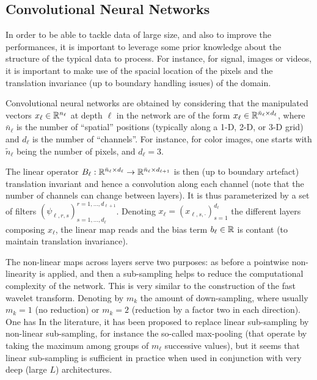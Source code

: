 \subsection{Convolutional Neural Networks}
\label{sec-cnn}

In order to be able to tackle data of large size, and also to improve the performances, it is important to leverage some prior knowledge about the structure of the typical data to process. For instance, for signal, images or videos, it is important to make use of the spacial location of the pixels and the translation invariance (up to boundary handling issues) of the domain.

Convolutional neural networks are obtained by considering that the manipulated vectors $x_\ell \in \mathbb{R}^{n_\ell}$ at depth $\ell$ in the network are of the form $x_\ell \in \mathbb{R}^{ \bar n_\ell \times d_\ell }$, where $\bar n_\ell$ is the number of ``spatial'' positions (typically along a 1-D, 2-D, or 3-D grid) and $d_\ell$ is the number of ``channels''.
%
For instance, for color images, one starts with $\tilde n_\ell$ being the number of pixels, and $d_\ell=3$.

The linear operator $B_\ell : \mathbb{R}^{ \bar n_\ell \times d_\ell } \rightarrow \mathbb{R}^{ \bar n_\ell \times d_{\ell+1} }$ is then (up to boundary artefact) translation invariant and hence a convolution along each channel (note that the number of channels can change between layers). It is thus parameterized by a set of filters $( \psi_{\ell,r,s} )_{s=1,\ldots,d_{\ell}}^{r=1,\ldots,d_{\ell+1}}$. Denoting $x_\ell = ( x_{\ell,s,\cdot} )_{s=1}^{d_\ell}$ the different layers composing $x_\ell$, the linear map reads
and the bias term $b_\ell \in \mathbb{R}$ is contant (to maintain translation invariance).

The non-linear maps across layers serve two purposes: as before a pointwise non-linearity is applied, and then a sub-sampling helps to reduce the computational complexity of the network. This is very similar to the construction of the fast wavelet transform. Denoting by $m_k$ the amount of down-sampling, where usually $m_k=1$ (no reduction) or $m_k=2$ (reduction by a factor two in each direction). One has
In the literature, it has been proposed to replace linear sub-sampling by non-linear sub-sampling, for instance the so-called max-pooling (that operate by taking the maximum among groups of $m_\ell$ successive values), but it seems that linear sub-sampling is sufficient in practice when used in conjunction with very deep (large $L$) architectures. 

